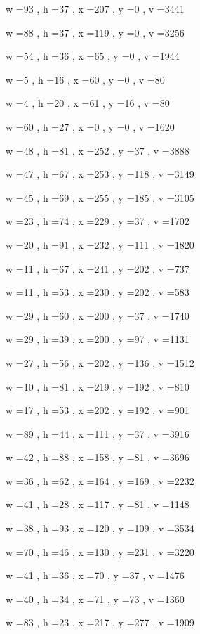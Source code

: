 \documentclass[11pt]{article}
\begin{document}
w =93 , h =37 , x =207 , y =0 , v =3441
\par
w =88 , h =37 , x =119 , y =0 , v =3256
\par
w =54 , h =36 , x =65 , y =0 , v =1944
\par
w =5 , h =16 , x =60 , y =0 , v =80
\par
w =4 , h =20 , x =61 , y =16 , v =80
\par
w =60 , h =27 , x =0 , y =0 , v =1620
\par
w =48 , h =81 , x =252 , y =37 , v =3888
\par
w =47 , h =67 , x =253 , y =118 , v =3149
\par
w =45 , h =69 , x =255 , y =185 , v =3105
\par
w =23 , h =74 , x =229 , y =37 , v =1702
\par
w =20 , h =91 , x =232 , y =111 , v =1820
\par
w =11 , h =67 , x =241 , y =202 , v =737
\par
w =11 , h =53 , x =230 , y =202 , v =583
\par
w =29 , h =60 , x =200 , y =37 , v =1740
\par
w =29 , h =39 , x =200 , y =97 , v =1131
\par
w =27 , h =56 , x =202 , y =136 , v =1512
\par
w =10 , h =81 , x =219 , y =192 , v =810
\par
w =17 , h =53 , x =202 , y =192 , v =901
\par
w =89 , h =44 , x =111 , y =37 , v =3916
\par
w =42 , h =88 , x =158 , y =81 , v =3696
\par
w =36 , h =62 , x =164 , y =169 , v =2232
\par
w =41 , h =28 , x =117 , y =81 , v =1148
\par
w =38 , h =93 , x =120 , y =109 , v =3534
\par
w =70 , h =46 , x =130 , y =231 , v =3220
\par
w =41 , h =36 , x =70 , y =37 , v =1476
\par
w =40 , h =34 , x =71 , y =73 , v =1360
\par
w =83 , h =23 , x =217 , y =277 , v =1909
\par
\newpage
\end{document}
